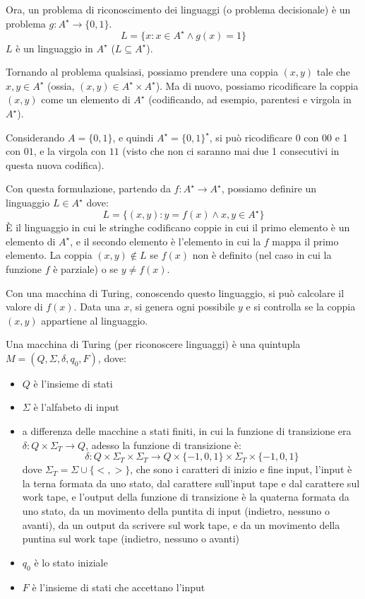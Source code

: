 Ora, un problema di riconoscimento dei linguaggi (o problema decisionale) \`e un problema $g : A^{\star} \to \{ 0, 1 \}$.
\[
L = \{ x : x \in A^{\star} \land g(x) = 1 \}
\]
$L$ \`e un linguaggio in $A^{\star}$ ($L \subseteq A^{\star}$).

Tornando al problema qualsiasi, possiamo prendere una coppia $(x,y)$ tale che $x, y \in A^{\star}$ (ossia, $(x,y) \in A^{\star} \times A^{\star}$). Ma di nuovo, possiamo ricodificare la coppia $(x,y)$ come un elemento di $A^{\star}$ (codificando, ad esempio, parentesi e virgola in $A^{\star}$).

Considerando $A = \{ 0, 1 \}$, e quindi $A^{\star} = \{ 0, 1 \}^{\star}$, si pu\`o ricodificare 0 con $00$ e 1 con $01$, e la virgola con $11$ (visto che non ci saranno mai due 1 consecutivi in questa nuova codifica).

Con questa formulazione, partendo da $f : A^{\star} \to A^{\star}$, possiamo definire un linguaggio $L \in A^{\star}$ dove:
\[
L = \{ (x,y) : y = f(x) \land x, y \in A^{\star} \}
\]
\`E il linguaggio in cui le stringhe codificano coppie in cui il primo elemento \`e un elemento di $A^{\star}$, e il secondo elemento \`e l'elemento in cui la $f$ mappa il primo elemento. La coppia $(x,y) \notin L$ se $f(x)$ non \`e definito (nel caso in cui la funzione $f$ \`e parziale) o se $y \neq f(x)$.

Con una macchina di Turing, conoscendo questo linguaggio, si pu\`o calcolare il valore di $f(x)$. Data una $x$, si genera ogni possibile $y$ e si controlla se la coppia $(x,y)$ appartiene al linguaggio.

\begin{defn}
Una macchina di Turing (per riconoscere linguaggi) \`e una quintupla $M = (Q, \Sigma, \delta, q_0, F)$, dove:
\begin{itemize}
    \item $Q$ \`e l'insieme di stati
    \item $\Sigma$ \`e l'alfabeto di input
    \item a differenza delle macchine a stati finiti, in cui la funzione di transizione era $\delta : Q \times \Sigma_T \to Q$, adesso la funzione di transizione \`e:
    \[
    \delta : Q \times \Sigma_T \times \Sigma_T \to Q \times \{ -1, 0, 1 \} \times \Sigma_T \times \{ -1, 0, 1 \}
    \]
    dove $\Sigma_T = \Sigma \cup \{ < , > \}$, che sono i caratteri di inizio e fine input, l'input \`e la terna formata da uno stato, dal carattere sull'input tape e dal carattere sul work tape, e l'output della funzione di transizione \`e la quaterna formata da uno stato, da un movimento della puntita di input (indietro, nessuno o avanti), da un output da scrivere sul work tape, e da un movimento della puntina sul work tape (indietro, nessuno o avanti)
    \item $q_0$ \`e lo stato iniziale
    \item $F$ \`e l'insieme di stati che accettano l'input
\end{itemize}
\end{defn}

